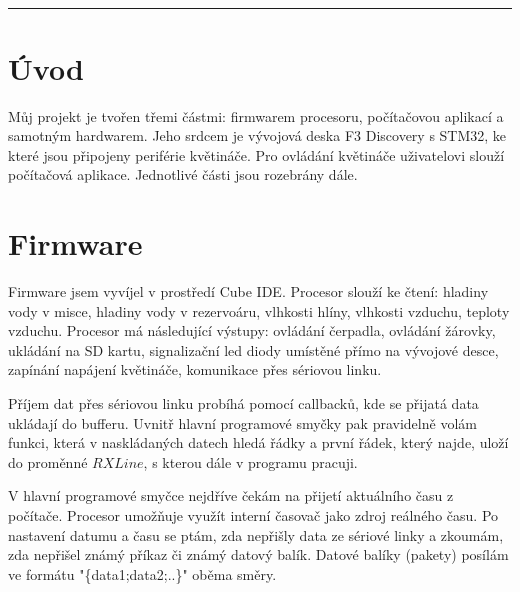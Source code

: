 \documentclass[11pt,a4paper]{article}
\begin{document}
	\begin{center}
		\section*{}
	\end{center}

	
	\noindent
	\rule{17cm}{0.05cm}
	\section{Úvod}
	Můj projekt je tvořen třemi částmi: firmwarem procesoru, počítačovou aplikací a samotným hardwarem. Jeho srdcem je vývojová deska F3 Discovery s STM32, ke které jsou připojeny periférie květináče. Pro ovládání květináče uživatelovi slouží počítačová aplikace. Jednotlivé části jsou rozebrány dále.
	
	\section{Firmware}
	Firmware jsem vyvíjel v prostředí Cube IDE. Procesor slouží ke čtení: hladiny vody v misce, hladiny vody v rezervoáru, vlhkosti hlíny, vlhkosti vzduchu, teploty vzduchu. Procesor má následující výstupy: ovládání čerpadla, ovládání žárovky, ukládání na SD kartu, signalizační led diody umístěné přímo na vývojové desce, zapínání napájení květináče, komunikace přes sériovou linku.
	
	Příjem dat přes sériovou linku probíhá pomocí callbacků, kde se přijatá data ukládají do bufferu. Uvnitř hlavní programové smyčky pak pravidelně volám funkci, která v naskládaných datech hledá řádky a první řádek, který najde, uloží do proměnné $RXLine$, s kterou dále v programu pracuji. 
	
	V hlavní programové smyčce nejdříve čekám na přijetí aktuálního času z počítače. Procesor umožňuje využít interní časovač jako zdroj reálného času. Po nastavení datumu a času se ptám, zda nepřišly data ze sériové linky a zkoumám, zda nepřišel známý příkaz či známý datový balík. Datové balíky (pakety) posílám ve formátu "\{data1;data2;..\}" oběma směry. 
	
\end{document}
